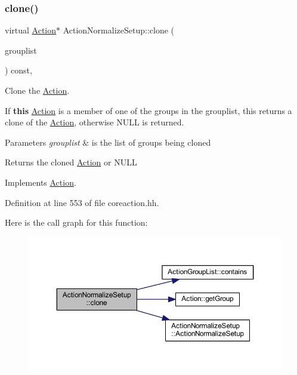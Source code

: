 \subsubsection{\texorpdfstring{clone()}{clone()}}
{\footnotesize\ttfamily virtual \mbox{\hyperlink{class_action}{Action}}$\ast$ Action\+Normalize\+Setup\+::clone (\begin{DoxyParamCaption}\item[{const \mbox{\hyperlink{class_action_group_list}{Action\+Group\+List}} \&}]{grouplist }\end{DoxyParamCaption}) const\hspace{0.3cm}{\ttfamily [inline]}, {\ttfamily [virtual]}}



Clone the \mbox{\hyperlink{class_action}{Action}}. 

If {\bfseries{this}} \mbox{\hyperlink{class_action}{Action}} is a member of one of the groups in the grouplist, this returns a clone of the \mbox{\hyperlink{class_action}{Action}}, otherwise N\+U\+LL is returned. 
\begin{DoxyParams}{Parameters}
{\em grouplist} & is the list of groups being cloned \\
\hline
\end{DoxyParams}
\begin{DoxyReturn}{Returns}
the cloned \mbox{\hyperlink{class_action}{Action}} or N\+U\+LL 
\end{DoxyReturn}


Implements \mbox{\hyperlink{class_action_af8242e41d09e5df52f97df9e65cc626f}{Action}}.



Definition at line 553 of file coreaction.\+hh.

Here is the call graph for this function\+:
\nopagebreak
\begin{figure}[H]
\begin{center}
\leavevmode
\includegraphics[width=350pt]{class_action_normalize_setup_a2c000f58b714f940cfab12142a0b294f_cgraph}
\end{center}
\end{figure}


